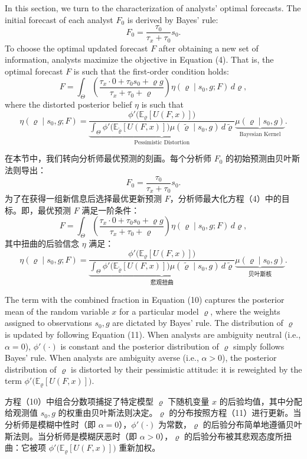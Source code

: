 \documentclass[12pt,a4paper]{article}
\newenvironment{original}
  {\par\medskip\noindent\ignorespaces}
  {\par\medskip}
\newenvironment{translation}
  {\par\noindent{\color{transblue}\ignorespaces}}
  {\par\bigskip}
\begin{document}
\begin{original}
In this section, we turn to the characterization of analysts' optimal forecasts. The initial forecast of each analyst $F_0$ is derived by Bayes' rule:
\[
F_0 = \frac{\tau_0}{\tau_x + \tau_0} s_0. \tag{9}
\]
To choose the optimal updated forecast $F$ after obtaining a new set of information, analysts maximize the objective in Equation (4). That is, the optimal forecast $F$ is such that the first-order condition holds:
\[
F = \int_{\Theta} \left( \frac{\tau_x \cdot 0 + \tau_0 s_0 + \varrho g}{\tau_x + \tau_0 + \varrho} \right) \eta(\varrho \mid s_0, g; F) \, d\varrho, \tag{10}
\]
where the distorted posterior belief $\eta$ is such that
\[
\eta(\varrho \mid s_0, g; F) = \underbrace{\frac{\phi'\big( \mathbb{E}_{\varrho}[U(F,x)] \big)}{\int_{\Theta} \phi'\big( \mathbb{E}_{\tilde{\varrho}}[U(F,x)] \big) \mu(\tilde{\varrho} \mid s_0, g) \, d\tilde{\varrho}}}_{\text{Pessimistic Distortion}} \underbrace{\mu(\varrho \mid s_0, g)}_{\text{Bayesian Kernel}}. \tag{11}
\]
\end{original}
\begin{translation}
在本节中，我们转向分析师最优预测的刻画。每个分析师 $F_0$ 的初始预测由贝叶斯法则导出：
\[
F_0 = \frac{\tau_0}{\tau_x + \tau_0} s_0. \tag{9}
\]
为了在获得一组新信息后选择最优更新预测 $F$，分析师最大化方程（4）中的目标。即，最优预测 $F$ 满足一阶条件：
\[
F = \int_{\Theta} \left( \frac{\tau_x \cdot 0 + \tau_0 s_0 + \varrho g}{\tau_x + \tau_0 + \varrho} \right) \eta(\varrho \mid s_0, g; F) \, d\varrho, \tag{10}
\]
其中扭曲的后验信念 $\eta$ 满足：
\[
\eta(\varrho \mid s_0, g; F) = \underbrace{\frac{\phi'\big( \mathbb{E}_{\varrho}[U(F,x)] \big)}{\int_{\Theta} \phi'\big( \mathbb{E}_{\tilde{\varrho}}[U(F,x)] \big) \mu(\tilde{\varrho} \mid s_0, g) \, d\tilde{\varrho}}}_{\text{悲观扭曲}}\underbrace{\mu(\varrho \mid s_0, g)}_{\text{贝叶斯核}}. \tag{11}
\]
\end{translation}

\begin{original}
The term with the combined fraction in Equation (10) captures the posterior mean of the random variable $x$ for a particular model $\varrho$, where the weights assigned to observations $s_0, g$ are dictated by Bayes' rule. The distribution of $\varrho$ is updated by following Equation (11). When analysts are ambiguity neutral (i.e., $\alpha = 0$), $\phi'(\cdot)$ is constant and the posterior distribution of $\varrho$ simply follows Bayes' rule. When analysts are ambiguity averse (i.e., $\alpha > 0$), the posterior distribution of $\varrho$ is distorted by their pessimistic attitude: it is reweighted by the term $\phi'\big( \mathbb{E}_{\varrho}[U(F,x)] \big)$.
\end{original}
\begin{translation}
方程（10）中组合分数项捕捉了特定模型 $\varrho$ 下随机变量 $x$ 的后验均值，其中分配给观测值 $s_0, g$ 的权重由贝叶斯法则决定。$\varrho$ 的分布按照方程（11）进行更新。当分析师是模糊中性时（即 $\alpha = 0$），$\phi'(\cdot)$ 为常数，$\varrho$ 的后验分布简单地遵循贝叶斯法则。当分析师是模糊厌恶时（即 $\alpha > 0$），$\varrho$ 的后验分布被其悲观态度所扭曲：它被项 $\phi'\big( \mathbb{E}_{\varrho}[U(F,x)] \big)$ 重新加权。
\end{translation}
\end{document}

